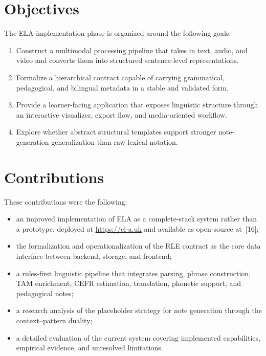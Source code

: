 \documentclass[12pt,a4paper,oneside]{report}
\begin{document}
\section{Objectives}
The ELA implementation phase is organized around the following goals:
\begin{enumerate}
  \item Construct a multimodal processing pipeline that takes in text, audio, and video and converts them into structured sentence-level representations.
  \item Formalize a hierarchical contract capable of carrying grammatical, pedagogical, and bilingual metadata in a stable and validated form.
  \item Provide a learner-facing application that exposes linguistic structure through an interactive visualizer, export flow, and media-oriented workflow.
  \item Explore whether abstract structural templates support stronger note-generation generalization than raw lexical notation.
\end{enumerate}

\section{Contributions}
These contributions were the following:
\begin{itemize}
  \item an improved implementation of ELA as a complete-stack system rather than a prototype, deployed at \url{https://el-a.uk} and available as open-source at~[16];
  \item the formalization and operationalization of the RLE contract as the core data interface between backend, storage, and frontend;
  \item a rules-first linguistic pipeline that integrates parsing, phrase construction, TAM enrichment, CEFR estimation, translation, phonetic support, and pedagogical notes;
  \item a research analysis of the placeholder strategy for note generation through the context--pattern duality;
  \item a detailed evaluation of the current system covering implemented capabilities, empirical evidence, and unresolved limitations.
\end{itemize}
\end{document}
